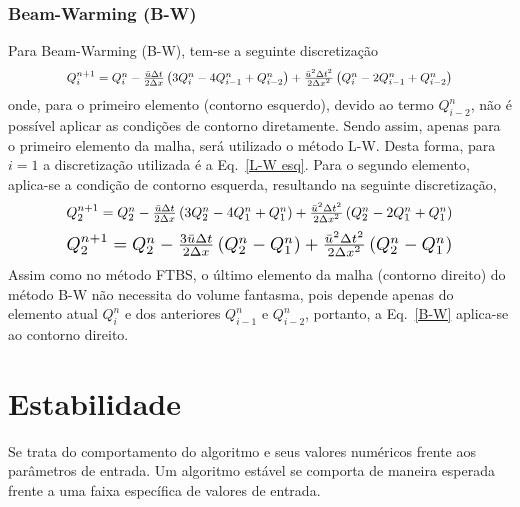 \subsubsection{Beam-Warming (B-W)}
Para Beam-Warming (B-W), tem-se a seguinte discretização
\begin{equation}\label{B-W}
    \resizebox{0.8\textwidth}{!}
    {$
    Q_i^{n+1} = Q_i^n - \frac{\bar{u}\Delta t}{2\Delta x}\left(
        3Q_i^n - 4Q_{i-1}^n + Q_{i-2}^n
    \right) + \frac{\bar{u}^2{\Delta t}^2}{2{\Delta x}^2}\left(
        Q_i^n - 2Q_{i-1}^n + Q_{i-2}^n
    \right)
    $}
\end{equation}
onde, para o primeiro elemento (contorno esquerdo), devido ao termo
$Q_{i-2}^n$, não é possível aplicar as condições de contorno diretamente. Sendo
assim, apenas para o primeiro elemento da malha, será utilizado o método L-W.
Desta forma, para $i=1$ a discretização utilizada é a Eq.\ \ref{L-W esq}. Para
o segundo elemento, aplica-se a condição de contorno esquerda, resultando na
seguinte discretização,
\[
    \resizebox{0.8\textwidth}{!}
    {$
    Q_2^{n+1} = Q_2^n - \frac{\bar{u}\Delta t}{2\Delta x}\left(
        3Q_2^n - 4Q_1^n + Q_1^n
    \right) + \frac{\bar{u}^2{\Delta t}^2}{2{\Delta x}^2}\left(
        Q_2^n - 2Q_1^n + Q_1^n
    \right)
    $}
\]
\begin{equation}
    \resizebox{0.8\textwidth}{!}
    {$
    Q_2^{n+1} = Q_2^n - \frac{3\bar{u}\Delta t}{2\Delta x}\left(
        Q_2^n - Q_1^n
    \right) + \frac{\bar{u}^2{\Delta t}^2}{2{\Delta x}^2}\left(
        Q_2^n - Q_1^n
    \right)
    $}
\end{equation}
Assim como no método FTBS, o último elemento da malha (contorno direito) do
método B-W não necessita do volume fantasma, pois depende apenas do elemento
atual $Q_i^n$ e dos anteriores $Q_{i-1}^n$ e $Q_{i-2}^n$, portanto, a Eq.\
\ref{B-W} aplica-se ao contorno direito.

\section{Estabilidade}
Se trata do comportamento do algoritmo e seus valores numéricos frente aos
parâmetros de entrada. Um algoritmo estável se comporta de maneira esperada
frente a uma faixa específica de valores de entrada.

